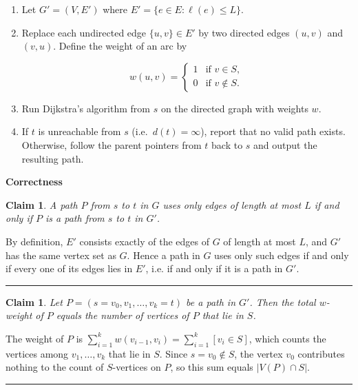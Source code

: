 \documentclass[11pt]{article}
\newenvironment{proof}{{\bf Proof:  }}{\hfill\rule{2mm}{2mm}}
\newtheorem{claim}[fact]{Claim}
\begin{document}
\begin{enumerate}
  \item Let $G' = (V, E')$ where $E' = \{e \in E : \ell(e) \le L\}$.

  \item Replace each undirected edge $\{u,v\} \in E'$ by two directed edges $(u,v)$ and $(v,u)$. Define the weight of an arc by

  $$w(u,v) = \begin{cases} 1 & \text{if } v \in S,\\ 0 & \text{if } v \notin S. \end{cases}$$

  \item Run Dijkstra's algorithm from $s$ on the directed graph with weights $w$.

  \item If $t$ is unreachable from $s$ (i.e.\ $d(t) = \infty$), report that no valid path exists. Otherwise, follow the parent pointers from $t$
  back to $s$ and output the resulting path.
\end{enumerate}

\medskip

\textbf{Correctness}

\begin{claim}\label{lem:feasible}
A path $P$ from $s$ to $t$ in $G$ uses only edges of length at most $L$ if and only if $P$ is a path from $s$ to $t$ in $G'$.
\end{claim}

\begin{proof}
By definition, $E'$ consists exactly of the edges of $G$ of length at most $L$, and $G'$ has the same vertex set as $G$. 
Hence a path in $G$ uses only such edges if and only if every one of its edges lies in $E'$, i.e. if and only if it is a
path in $G'$.
\end{proof}

\begin{claim}\label{lem:cost}
Let $P = (s = v_0, v_1, \dots, v_k = t)$ be a path in $G'$. Then the total $w$-weight of $P$ equals the number of vertices of $P$ that lie in $S$.
\end{claim}

\begin{proof}
The weight of $P$ is $\sum_{i=1}^{k} w(v_{i-1}, v_i) = \sum_{i=1}^{k} [v_i \in S]$, which counts the vertices among $v_1,\dots,v_k$ that lie in $S$. 
Since $s = v_0 \notin S$, the vertex $v_0$ contributes nothing to the count of $S$-vertices on $P$, so this sum equals $|V(P) \cap S|$.
\end{proof}
\end{document}
